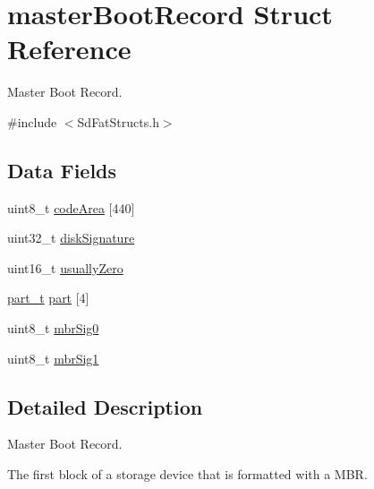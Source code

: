 \hypertarget{structmaster_boot_record}{\section{master\-Boot\-Record Struct Reference}
\label{structmaster_boot_record}
}


Master Boot Record.  




{\ttfamily \#include $<$Sd\-Fat\-Structs.\-h$>$}

\subsection*{Data Fields}
\begin{DoxyCompactItemize}
\item 
uint8\-\_\-t \hyperlink{structmaster_boot_record_a714f552faf0b0f09ffc53e2ba52ddbc3}{code\-Area} \mbox{[}440\mbox{]}
\item 
uint32\-\_\-t \hyperlink{structmaster_boot_record_a6a40348b3b308847ba21a75829d91871}{disk\-Signature}
\item 
uint16\-\_\-t \hyperlink{structmaster_boot_record_aefe56bef1bc942c24bc7eefc4a7aefcc}{usually\-Zero}
\item 
\hyperlink{_sd_fat_structs_8h_a37251e7d5c69a159be727a3fc8c9d0e6}{part\-\_\-t} \hyperlink{structmaster_boot_record_aa65f87792f271fc6cfa70980af6ac3dd}{part} \mbox{[}4\mbox{]}
\item 
uint8\-\_\-t \hyperlink{structmaster_boot_record_aa5633d8ea0049be26315e7627e32bb4e}{mbr\-Sig0}
\item 
uint8\-\_\-t \hyperlink{structmaster_boot_record_af106928fafe93a641c06cfb87b0d24e3}{mbr\-Sig1}
\end{DoxyCompactItemize}


\subsection{Detailed Description}
Master Boot Record. 

The first block of a storage device that is formatted with a M\-B\-R. 

